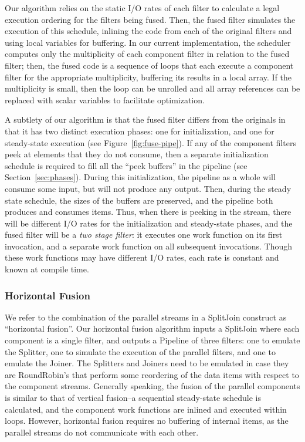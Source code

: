Our algorithm relies on the static I/O rates of each filter to
calculate a legal execution ordering for the filters being fused.
Then, the fused filter simulates the execution of this schedule,
inlining the code from each of the original filters and using local
variables for buffering.  In our current implementation, the scheduler
computes only the multiplicity of each component filter in relation to
the fused filter; then, the fused code is a sequence of loops that
each execute a component filter for the appropriate multiplicity,
buffering its results in a local array.  If the multiplicity is small,
then the loop can be unrolled and all array references can be replaced
with scalar variables to facilitate optimization.

A subtlety of our algorithm is that the fused filter differs from the
originals in that it has two distinct execution phases: one for
initialization, and one for steady-state execution (see
Figure~\ref{fig:fuse-pipe}).  If any of the component filters peek at
elements that they do not consume, then a separate initialization
schedule is required to fill all the ``peek buffers'' in the pipeline
(see Section~\ref{sec:phases}).  During this initialization, the
pipeline as a whole will consume some input, but will not produce any
output.  Then, during the steady state schedule, the sizes of the
buffers are preserved, and the pipeline both produces and consumes
items.  Thus, when there is peeking in the stream, there will be
different I/O rates for the initialization and steady-state phases,
and the fused filter will be a {\it two stage filter}: it executes one
work function on its first invocation, and a separate work function on
all subsequent invocations.  Though these work functions may have
different I/O rates, each rate is constant and known at compile time.

\subsubsection{Horizontal Fusion}

We refer to the combination of the parallel streams in a SplitJoin
construct as ``horizontal fusion''.  Our horizontal fusion algorithm
inputs a SplitJoin where each component is a single filter, and
outputs a Pipeline of three filters: one to emulate the Splitter, one
to simulate the execution of the parallel filters, and one to emulate
the Joiner.  The Splitters and Joiners need to be emulated in case
they are RoundRobin's that perform some reordering of the data items
with respect to the component streams.  Generally speaking, the fusion
of the parallel components is similar to that of vertical fusion--a
sequential steady-state schedule is calculated, and the component work
functions are inlined and executed within loops.  However, horizontal
fusion requires no buffering of internal items, as the parallel
streams do not communicate with each other.

